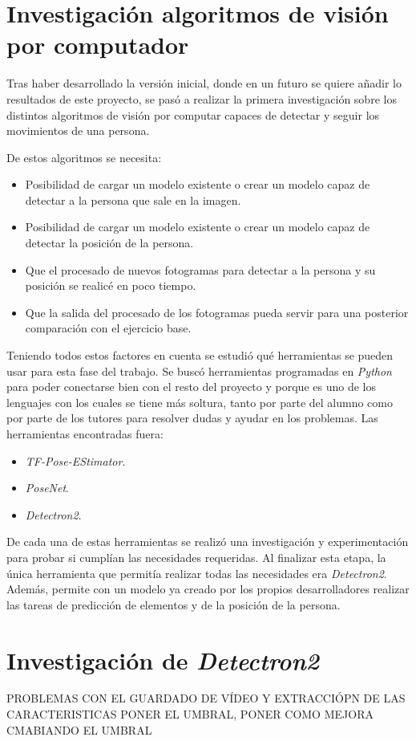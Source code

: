 \section{Investigación algoritmos de visión por computador}
Tras haber desarrollado la versión inicial, donde en un futuro se quiere añadir lo resultados de este proyecto, se pasó a realizar la primera investigación sobre los distintos algoritmos de visión por computar capaces de detectar y seguir los movimientos de una persona. 

De estos algoritmos se necesita:
\begin{itemize}
	\item Posibilidad de cargar un modelo existente o crear un modelo capaz de detectar a la persona que sale en la imagen.
	\item Posibilidad de cargar un modelo existente o crear un modelo capaz de detectar la posición de la persona.
	\item Que el procesado de nuevos fotogramas para detectar a la persona y su posición se realicé en poco tiempo.
	\item Que la salida del procesado de los fotogramas pueda servir para una posterior comparación con el ejercicio base.
\end{itemize}

Teniendo todos estos factores en cuenta se estudió qué herramientas se pueden usar para esta fase del trabajo. Se buscó herramientas programadas en \textit{Python} para poder conectarse bien con el resto del proyecto y porque es uno de los lenguajes con los cuales se tiene más soltura, tanto por parte del alumno como por parte de los tutores para resolver dudas y ayudar en los problemas. Las herramientas encontradas fuera:
\begin{itemize}
	\item \textit{TF-Pose-EStimator}.
	\item \textit{PoseNet}.
	\item \textit{Detectron2}.
\end{itemize}

De cada una de estas herramientas se realizó una investigación y experimentación para probar si cumplían las necesidades requeridas. Al finalizar esta etapa, la única herramienta que permitía realizar todas las necesidades era \textit{Detectron2}. Además, permite con un modelo ya creado por los propios desarrolladores realizar las tareas de predicción de elementos y de la posición de la persona.

\section{Investigación de \textit{Detectron2}}
PROBLEMAS CON EL GUARDADO DE VÍDEO Y EXTRACCIÓPN DE LAS CARACTERISTICAS
PONER EL UMBRAL, PONER COMO MEJORA CMABIANDO EL UMBRAL 